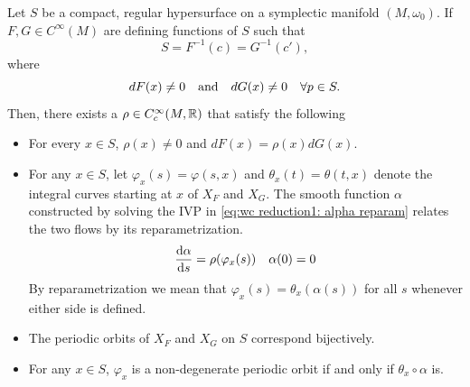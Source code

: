 \documentclass[../main-v2-manifolds.tex]{subfiles}
\begin{document}
\begin{wts}\label{thm:wc reduction 1 hamiltonian}
    Let $S$ be a compact, regular hypersurface on a symplectic manifold $(M,\omega_0)$. If $F, G\in C^\infty(M)$ are defining functions of $S$ such that
    \[S = F^{-1}(c) = G^{-1}(c'),\]
    where 
    \[dF(x)\neq 0\qqtext{and}dG(x)\neq 0\quad\forall p\in S.\]
    Then, there exists a $\rho\in C_c^\infty(M,\mathbb{R})$ that satisfy the following
    \begin{itemize}
        \item For every $x\in S$, $\rho(x)\neq 0$ and $dF(x) = \rho(x) dG(x)$.
        \item For any $x\in S$, let $\varphi_x(s) = \varphi(s,x)$ and $\theta_x(t) = \theta(t,x)$ denote the integral curves starting at $x$ of $X_F$ and $X_G$. The smooth function $\alpha$ constructed by solving the IVP in \cref{eq:wc reduction1: alpha reparam} relates the two flows by its reparametrization.
        \begin{equation}
            \dv{\alpha}{s} = \rho(\varphi_x(s))\quad\alpha(0)=0
            \label{eq:wc reduction1: alpha reparam}
        \end{equation}
        By reparametrization we mean that $\varphi_x(s) = \theta_x(\alpha(s))$ for all $s$ whenever either side is defined.
        \item The periodic orbits of $X_{F}$ and $X_G$ on $S$ correspond bijectively.
        \item For any $x\in S$, $\varphi_x$ is a non-degenerate periodic orbit if and only if $\theta_x\circ\alpha$ is.
    \end{itemize}
\end{wts}
\end{document}
